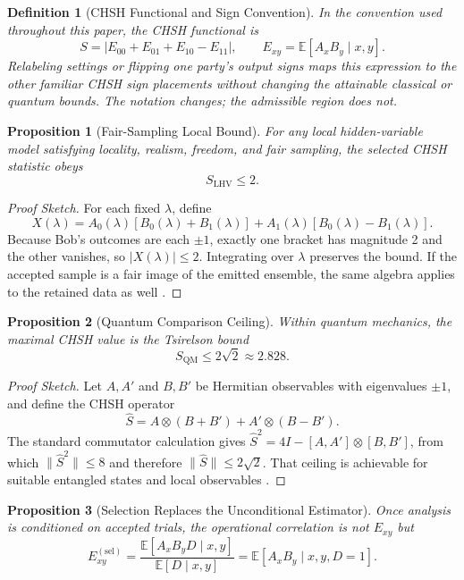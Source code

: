 \documentclass[11pt]{article}
\newcommand{\E}{\mathbb{E}}
\newcommand{\sel}{\mathrm{sel}}
\newcommand{\lhv}{\mathrm{LHV}}
\newcommand{\qm}{\mathrm{QM}}
\newtheorem*{definitionblock}{Definition}
\newtheorem{proposition}{Proposition}
\begin{document}
\begin{definitionblock}[CHSH Functional and Sign Convention]
In the convention used throughout this paper, the CHSH functional is
\[
S = \left|E_{00} + E_{01} + E_{10} - E_{11}\right|, \qquad E_{xy} = \E[A_x B_y \mid x,y].
\]
Relabeling settings or flipping one party's output signs maps this expression to the other familiar CHSH sign placements without changing the attainable classical or quantum bounds. The notation changes; the admissible region does not.
\end{definitionblock}

\begin{proposition}[Fair-Sampling Local Bound]
For any local hidden-variable model satisfying locality, realism, freedom, and fair sampling, the selected CHSH statistic obeys
\[
S_{\lhv} \le 2.
\]
\end{proposition}

\begin{proof}[Proof Sketch]
For each fixed $\lambda$, define
\[
X(\lambda) = A_0(\lambda)[B_0(\lambda) + B_1(\lambda)] + A_1(\lambda)[B_0(\lambda) - B_1(\lambda)].
\]
Because Bob's outcomes are each $\pm 1$, exactly one bracket has magnitude 2 and the other vanishes, so $|X(\lambda)| \le 2$. Integrating over $\lambda$ preserves the bound. If the accepted sample is a fair image of the emitted ensemble, the same algebra applies to the retained data as well \cite{bell1964,chsh1969,fine1982}.
\end{proof}

\begin{proposition}[Quantum Comparison Ceiling]
Within quantum mechanics, the maximal CHSH value is the Tsirelson bound
\[
S_{\qm} \le 2\sqrt{2} \approx 2.828.
\]
\end{proposition}

\begin{proof}[Proof Sketch]
Let $A, A'$ and $B, B'$ be Hermitian observables with eigenvalues $\pm 1$, and define the CHSH operator
\[
\hat{S} = A \otimes (B + B') + A' \otimes (B - B').
\]
The standard commutator calculation gives $\hat{S}^2 = 4I - [A,A'] \otimes [B,B']$, from which $\|\hat{S}^2\| \le 8$ and therefore $\|\hat{S}\| \le 2\sqrt{2}$. That ceiling is achievable for suitable entangled states and local observables \cite{tsirelson1980}.
\end{proof}

\begin{proposition}[Selection Replaces the Unconditional Estimator]
Once analysis is conditioned on accepted trials, the operational correlation is not $E_{xy}$ but
\[
E_{xy}^{(\sel)} = \frac{\E[A_x B_y D \mid x,y]}{\E[D \mid x,y]} = \E[A_x B_y \mid x,y,D=1].
\]
\end{proposition}
\end{document}
